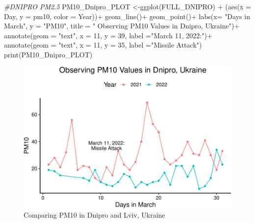 \documentclass[
  12pt,
]{article}
\newenvironment{Shaded}{\begin{snugshade}}{\end{snugshade}}
\newcommand{\AttributeTok}[1]{\textcolor[rgb]{0.77,0.63,0.00}{#1}}
\newcommand{\CommentTok}[1]{\textcolor[rgb]{0.56,0.35,0.01}{\textit{#1}}}
\newcommand{\DecValTok}[1]{\textcolor[rgb]{0.00,0.00,0.81}{#1}}
\newcommand{\FunctionTok}[1]{\textcolor[rgb]{0.00,0.00,0.00}{#1}}
\newcommand{\NormalTok}[1]{#1}
\newcommand{\OtherTok}[1]{\textcolor[rgb]{0.56,0.35,0.01}{#1}}
\newcommand{\SpecialCharTok}[1]{\textcolor[rgb]{0.00,0.00,0.00}{#1}}
\newcommand{\StringTok}[1]{\textcolor[rgb]{0.31,0.60,0.02}{#1}}
\begin{document}
\begin{Shaded}
\begin{Highlighting}[]
\CommentTok{\#DNIPRO PM2.5}
\NormalTok{PM10\_Dnipro\_PLOT }\OtherTok{\textless{}{-}}\FunctionTok{ggplot}\NormalTok{(FULL\_DNIPRO) }\SpecialCharTok{+} 
\NormalTok{  (}\FunctionTok{aes}\NormalTok{(}\AttributeTok{x =}\NormalTok{ Day, }\AttributeTok{y =}\NormalTok{ pm10, }\AttributeTok{color =}\NormalTok{ Year))}\SpecialCharTok{+} 
  \FunctionTok{geom\_line}\NormalTok{()}\SpecialCharTok{+}  
  \FunctionTok{geom\_point}\NormalTok{()}\SpecialCharTok{+}
  \FunctionTok{labs}\NormalTok{(}\AttributeTok{x=} \StringTok{"Days in March"}\NormalTok{, }\AttributeTok{y =} \StringTok{"PM10"}\NormalTok{,}
  \AttributeTok{title =} \StringTok{"         Observing PM10 Values in Dnipro, Ukraine"}\NormalTok{)}\SpecialCharTok{+} 
  \FunctionTok{annotate}\NormalTok{(}\AttributeTok{geom =} \StringTok{"text"}\NormalTok{, }\AttributeTok{x =} \DecValTok{11}\NormalTok{, }\AttributeTok{y =} \DecValTok{39}\NormalTok{, }\AttributeTok{label =}\StringTok{"March 11, 2022:"}\NormalTok{)}\SpecialCharTok{+} 
  \FunctionTok{annotate}\NormalTok{(}\AttributeTok{geom =} \StringTok{"text"}\NormalTok{, }\AttributeTok{x =} \DecValTok{11}\NormalTok{, }\AttributeTok{y =} \DecValTok{35}\NormalTok{, }\AttributeTok{label =}\StringTok{"Missile Attack"}\NormalTok{)}
\FunctionTok{print}\NormalTok{(PM10\_Dnipro\_PLOT) }
\end{Highlighting}
\end{Shaded}

\begin{figure}
\centering
\includegraphics{Fontanie_Gordon_Weinberg_Project_files/figure-latex/Plotting PM10-1.pdf}
\caption{Comparing PM10 in Dnipro and Lviv, Ukraine}
\end{figure}
\end{document}
